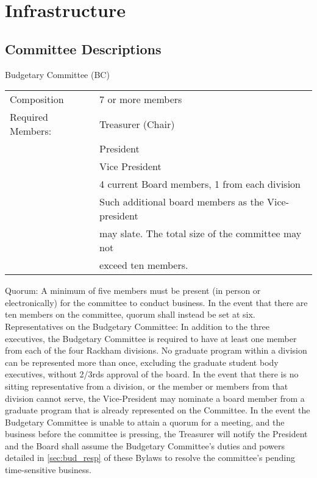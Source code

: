 \chapter{Infrastructure}
\section{Committee Descriptions}
\begin{enumsubsection}
\item{Budgetary Committee (BC)}\\
\begin{tabular}{ll}
Composition & 7 or more members\\
Required Members:& Treasurer (Chair)\\
 & President\\
 & Vice President\\
 & 4 current Board members, 1 from each division \\
 & Such additional board members as the Vice-president\\
 & may slate. The total size of the committee may not\\
 & exceed ten members.
\end{tabular}
\begin{enumsubsubsection}
\itemnotoc Quorum: A minimum of five members must be present (in person or electronically) for the committee to conduct business. In the event that there are ten members on the committee, quorum shall instead be set at six.
\itemnotoc Representatives on the Budgetary Committee: In addition to the three executives, the Budgetary Committee is required to have at least one member from each of the four Rackham divisions.  No graduate program within a division can be represented more than once, excluding the graduate student body executives, without 2/3rds approval of the board.  In the event that there is no sitting representative from a division, or the member or members from that division cannot serve, the Vice-President may nominate a board member from a graduate program that is already represented on the Committee.
\itemnotoc   In the event the Budgetary Committee is unable to attain a quorum for a meeting, and the business before the committee is pressing, the Treasurer will notify the President and the Board shall assume the Budgetary Committee's duties and powers detailed in \ref{sec:bud_resp} of these Bylaws to resolve the committee's pending time-sensitive business.



\end{enumsubsubsection}
\end{enumsubsection}

